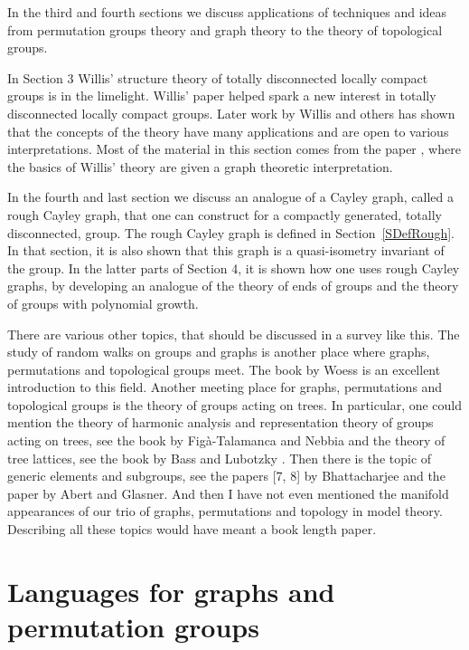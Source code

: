 \documentclass{emsprocart}
\theoremstyle{definition}
\begin{document}
In the third and fourth sections we discuss applications of techniques and ideas from permutation groups theory and graph theory to the theory of topological groups.

In Section 3 Willis' structure theory of totally disconnected locally compact groups is in the limelight.  Willis' paper \cite{Willis1994} helped spark a new interest in totally disconnected locally compact groups.  Later work by Willis and others has shown that the concepts of the theory have many applications and are open to various interpretations.  Most of the material in this section comes from the paper \cite{Moller2002}, where the basics of Willis' theory are given a graph theoretic interpretation.

In the fourth and last section we discuss an analogue of a Cayley graph, called a rough Cayley graph, that one can construct for a compactly generated, totally disconnected, group. The rough Cayley graph is defined in Section~\ref{SDefRough}.  In that section, it is also shown that this graph is a quasi-isometry invariant of the group.   In the latter parts of Section 4, it is shown how one uses rough Cayley graphs, by developing an analogue of the theory of  ends of groups and the theory of groups with polynomial growth.

There are various other topics, that should be discussed in  a survey like this.  The study of random walks on groups and graphs is another place where graphs, permutations and topological groups meet.  The book by Woess \cite{Woess2001} is an excellent introduction to this field.  Another meeting place for graphs, permutations and topological groups is the theory of groups acting on trees.  In particular, one could mention the theory of harmonic analysis and representation theory of groups acting on trees, see the book by  Fig{\`a}-Talamanca and Nebbia \cite{Figa-TalamancaNebbia1991} and the theory of tree lattices, see the book by Bass and Lubotzky \cite{BassLubotzky2001}.
Then there is the topic of generic elements and subgroups, see the papers [7, 8] by Bhattacharjee and the paper \cite{AbertGlasner2008} by Abert and Glasner.  And then I have not even mentioned the manifold appearances of our trio of graphs, permutations and topology in model theory.  Describing all these topics would have meant a book length paper.

\section{Languages for graphs and permutation groups}
\end{document}
